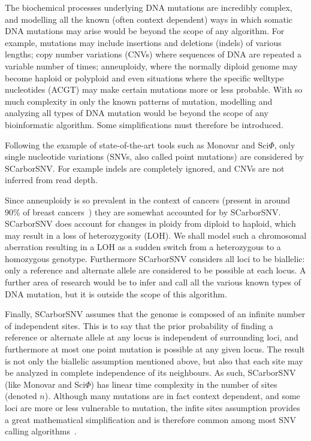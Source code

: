 \documentclass[../../main.tex]{subfiles}
\begin{document}
The biochemical processes underlying DNA mutations are incredibly complex, and modelling all the known (often context dependent) ways in which somatic DNA mutations may arise would be beyond the scope of any algorithm.
For example, mutations may include insertions and deletions (indels) of various lengths; copy number variations (CNVs) where sequences of DNA are repeated a variable number of times; anneuploidy, where the normally diploid genome may become haploid or polyploid and even situations where the specific welltype nucleotides (ACGT) may make certain mutations more or less probable\cite{monovar, 21breasts, 21breasts2, metastatic, gao2016punctuated}.
With so much complexity in only the known patterns of mutation, modelling and analyzing all types of DNA mutation would be beyond the scope of any bioinformatic algorithm.
Some simplifications must therefore be introduced.

Following the example of state-of-the-art tools such as Monovar and Sci$\Phi$, only single nucleotide variations (SNVs, also called point mutations) are considered by SCarborSNV.
For example indels are completely ignored, and CNVs are not inferred from read depth.

Since anneuploidy is so prevalent in the context of cancers (present in around 90\% of breast cancers~\cite{gao2016punctuated}) they are somewhat accounted for by SCarborSNV.
SCarborSNV does account for changes in ploidy from diploid to haploid, which may result in a loss of heterozygosity (LOH).
We shall model such a chromosomal aberration resulting in a LOH as a sudden switch from a heterozygous to a homozygous genotype.
Furthermore SCarborSNV considers all loci to be biallelic: only a reference and alternate allele are considered to be possible at each locus.
A further area of research would be to infer and call all the various known types of DNA mutation, but it is outside the scope of this algorithm.

Finally, SCarborSNV assumes that the genome is composed of an infinite number of independent sites.
This is to say that the prior probability of finding a reference or alternate allele at any locus is independent of surrounding loci, and furthermore at most one point mutation is possible at any given locus.
The result is not only the biallelic assumption mentioned above, but also that each site may be analyzed in complete independence of its neighbours.
As such, SCarborSNV (like Monovar and Sci$\Phi$) has linear time complexity in the number of sites (denoted $n$).
Although many mutations are in fact context dependent, and some loci are more or less vulnerable to mutation, the infite sites assumption provides a great mathematical simplification and is therefore common among most SNV calling algorithms~\cite{greenman2007patterns, 21breasts2, alexandrov2013signatures}.
\end{document}
